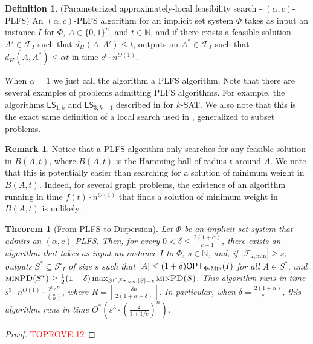 \documentclass[11pt, letterpaper]{article}
\newtheorem{theorem}{Theorem}
\theoremstyle{definition}
\newtheorem{definition}{Definition}
\newtheorem{remark}{Remark}
\newcommand{\Q}[1]{\{0,1\}^{#1}}
\newcommand{\calf}{\mathcal{F}}
\newcommand{\LS}{\textsf{LS}}
\newcommand{\phimin}{\Phi\textsc{-Min}}
\newcommand{\OPT}{\textsf{OPT}}
\newcommand{\PD}{\textsc{minPD}}
\newcommand{\IN}{\ensuremath{\mathbb{N}}}
\newcommand{\floor}[1]{{\left\lfloor{#1}\right\rfloor}}
\begin{document}
\begin{definition}(Parameterized approximately-local feasibility search - $(\alpha,c)$-PLFS) An $(\alpha,c)$-PLFS algorithm for an implicit set system $\Phi$ takes as input an instance $I$ for $\Phi$, $A \in \Q{n}$, and $t \in \IN$, and if there exists a feasible solution $A' \in \mathcal{F}_I$ such that $d_H(A,A') \leq t$, outputs an $A^* \in \mathcal{F}_I$ such that $d_H(A, A^*) \leq \alpha t$ in time $c^t \cdot n^{O(1)}$. 
\end{definition}
When $\alpha=1$ we just call the algorithm a PLFS algorithm. Note that there are several examples of problems admitting PLFS algorithms. For example, the algorithms $\LS_{1,k}$ and $\LS_{3, k-1}$ described in  for $k$-SAT. We also note that this is the exact same definition of a local search used in , generalized to subset problems. 

\begin{remark}
    Notice that a PLFS algorithm only searches for any feasible solution in $B(A,t)$, where $B(A,t)$ is the Hamming ball of radius $t$ around $A$. We note that this is potentially easier than searching for a solution of minimum weight in $B(A,t)$. Indeed, for several graph problems, the existence of an algorithm running in time $f(t) \cdot n^{O(1)}$ that finds a solution of minimum weight in $B(A,t)$ is unlikely~\cite{fellows2012local}.
\end{remark}
 
\begin{theorem}[From PLFS to Dispersion] \label{thm:PLFS}
    Let $\Phi$ be an implicit set system that admits an $(\alpha,c)$-PLFS. 
    Then, for every $0 < \delta \leq \frac{2(1+\alpha)}{c-1}$, there exists an algorithm that takes as input an instance $I$ to $\Phi$, $s \in \IN$, and, if $|\calf_{I, \text{min}}| \geq s$, outputs $S^* \subseteq \mathcal{F}_I$ of size $s$ such that $|A| \leq (1+\delta) \OPT_{\phimin}(I)$ for all $A \in S^*$, and $\PD(S^*) \geq \frac{1}{2}(1-\delta) \max_{S \subseteq \mathcal{F_{I, \textsc{min}}}, |S|=s} \PD(S)$. This algorithm runs in time $s^3 \cdot n^{O(1)} \cdot \frac{2^n c^{R}}{\binom{n}{R} }$, where $R=\floor{\frac{\delta n}{2(1+\alpha+\delta)}}$.
    In particular, when $\delta = \frac{2(1+\alpha)}{c-1}$, this algorithm runs in time $O^*\left( s^3 \cdot \left( \frac{2}{1+1/c} \right)^n \right)$.
\end{theorem}
\begin{proof}\textcolor{red}{TOPROVE 12}\end{proof}
\end{document}
